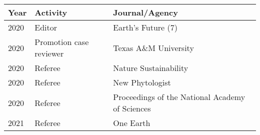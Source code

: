 
\begin{longtable}{llp{12cm}}
Year & Activity & Journal/Agency\\
\hline 
\endhead 
2020 & Editor & Earth's Future  (7)  \\
2020 & Promotion case reviewer & Texas A\&M University  \\
2020 & Referee & Nature Sustainability  \\
2020 & Referee & New Phytologist  \\
2020 & Referee & Proceedings of the National Academy of Sciences  \\
2021 & Referee & One Earth  \\
\end{longtable}

